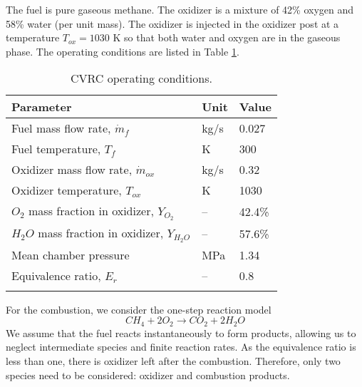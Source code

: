 The fuel is pure gaseous methane. The oxidizer is a mixture of 42\% oxygen and 58\% water (per unit mass). The oxidizer is injected in the oxidizer post at a temperature $T_{ox}=1030$ K so that both water and oxygen are in the gaseous phase. The operating conditions are listed in Table \ref{tab:operating-conditions}.

\begin{table} [h]
	\centering
	\caption{CVRC operating conditions.}
	\centering
	\begin{tabular}{l l l}
		\toprule
		\centering
		Parameter & Unit & Value \\
		\midrule
		Fuel mass flow rate, $\dot{m}_{f}$ & kg/s & 0.027   \\
		Fuel temperature, $T_{f}$ & K & 300   \\
		Oxidizer mass flow rate, $\dot{m}_{ox}$ & kg/s & 0.32   \\
		Oxidizer temperature, $T_{ox}$ & K & 1030   \\
		$O_2$ mass fraction in oxidizer, $Y_{O_2}$ & -- & 42.4\%   \\
		$H_2O$ mass fraction in oxidizer, $Y_{H_2O}$ & -- & 57.6\%   \\
		Mean chamber pressure & MPa & 1.34 \\
		Equivalence ratio, $E_r$ & -- & 0.8 \\
		\bottomrule
		\label{tab:operating-conditions}
	\end{tabular} 
\end{table}

For the combustion, we consider the one-step reaction model
\begin{equation*}\label{eq:combustion}
CH_4 + 2O_2 \rightarrow CO_2 + 2H_2O
\end{equation*}
We assume that the fuel reacts instantaneously to form products, allowing us to neglect intermediate species and finite reaction rates. As the equivalence ratio is less than one, there is oxidizer left after the combustion. Therefore, only two species need to be considered: oxidizer and combustion products.


